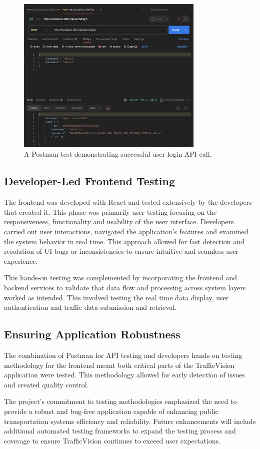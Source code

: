 \begin{figure}[h!]
    \centering
    \includegraphics[width=0.8\textwidth]{images/postmanLogin.png}
    \caption{A Postman test demonstrating successful user login API call.}
    \label{fig:postman_login_test}
\end{figure}

\subsection{Developer-Led Frontend Testing}

The frontend was developed with React and tested extensively by the developers that created it. This phase was primarily user testing focusing on the responsiveness, functionality and usability of the user interface. Developers carried out user interactions, navigated the application's features and examined the system behavior in real time. This approach allowed for fast detection and resolution of UI bugs or inconsistencies to ensure intuitive and seamless user experience.

This hands-on testing was complemented by incorporating the frontend and backend services to validate that data flow and processing across system layers worked as intended. This involved testing the real time data display, user authentication and traffic data submission and retrieval.

\subsection{Ensuring Application Robustness}

The combination of Postman for API testing and developers hands-on testing methodology for the frontend meant both critical parts of the TrafficVision application were tested. This methodology allowed for early detection of issues and created quality control.

The project's commitment to testing methodologies emphasized the need to provide a robust and bug-free application capable of enhancing public transportation systems efficiency and reliability. Future enhancements will include additional automated testing frameworks to expand the testing process and coverage to ensure TrafficVision continues to exceed user expectations.

